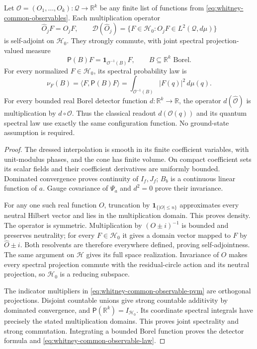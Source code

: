 \begin{theorem}
\label{thm:whitney-common-observables}
Let \(\mathcal O=(O_1,\ldots,O_k):\mathcal Q\to\mathbb R^k\)
be any finite list of functions from
\eqref{eq:whitney-common-observables}. Each multiplication operator
\[
 \widehat O_jF=O_jF,\qquad
 \mathcal D(\widehat O_j)
   =\{F\in\mathcal H_0:O_jF\in L^2(\mathcal Q,d\mu)\}
\]
is self-adjoint on \(\mathcal H_0\). They strongly commute, with
joint spectral projection-valued measure
\begin{equation}
 \mathsf P(B)F=\mathbf1_{\mathcal O^{-1}(B)}F,
 \qquad B\subseteq\mathbb R^k\text{ Borel}.
 \label{eq:whitney-common-observable-pvm}
\end{equation}
For every normalized \(F\in\mathcal H_0\), its spectral probability
law is
\begin{equation}
 \nu_F(B)=\langle F,\mathsf P(B)F\rangle
         =\int_{\mathcal O^{-1}(B)}|F(q)|^2\,d\mu(q).
 \label{eq:whitney-common-observable-law}
\end{equation}
For every bounded real Borel detector function \(d:\mathbb R^k\to
\mathbb R\), the operator \(d(\widehat{\mathcal O})\) is
multiplication by \(d\circ\mathcal O\). Thus the classical readout
\(d(\mathcal O(q))\) and its quantum spectral law use exactly the same
configuration function. No ground-state assumption is required.
\end{theorem}
\begin{proof}
The dressed interpolation is smooth in its finite coefficient variables,
with unit-modulus phases, and the cone has finite volume. On compact
coefficient sets its scalar fields and their coefficient derivatives are
uniformly bounded. Dominated convergence proves continuity of \(I_f,J_f\);
\(B_b\) is a continuous linear function of \(a\).
Gauge covariance of \(\Psi_a\) and \(d^2=0\) prove their invariance.

For any one such real function \(O\), truncation by
\(\mathbf1_{\{|O|\leq n\}}\) approximates every neutral Hilbert vector
and lies in the multiplication domain. This proves density. The operator
is symmetric. Multiplication by \((O\pm i)^{-1}\) is bounded and
preserves neutrality; for every \(F\in\mathcal H_0\) it gives a
domain vector mapped to \(F\) by \(\widehat O\pm i\).
Both resolvents are therefore everywhere defined, proving
self-adjointness. The same argument on \(\mathcal H\) gives its full
space realization. Invariance of \(O\) makes every spectral projection
commute with the residual-circle action and its neutral projection, so
\(\mathcal H_0\) is a reducing subspace.

The indicator multipliers in
\eqref{eq:whitney-common-observable-pvm} are orthogonal projections.
Disjoint countable unions give strong countable additivity by dominated
convergence, and \(\mathsf P(\mathbb R^k)=I_{\mathcal H_0}\).
Its coordinate spectral integrals have precisely the stated multiplication
domains. This proves joint spectrality and strong commutation. Integrating
a bounded Borel function proves the detector formula and
\eqref{eq:whitney-common-observable-law}.
\end{proof}

